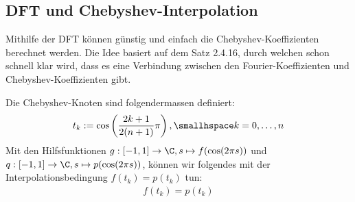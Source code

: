 \subsection{DFT und Chebyshev-Interpolation}
Mithilfe der DFT können günstig und einfach die Chebyshev-Koeffizienten berechnet werden.
Die Idee basiert auf dem Satz 2.4.16, durch welchen schon schnell klar wird, dass es eine Verbindung zwischen den Fourier-Koeffizienten und Chebyshev-Koeffizienten gibt.

Die Chebyshev-Knoten sind folgendermassen definiert:
\begin{align*}
    t_k := \cos\left( \frac{2k + 1}{2(n + 1)} \pi \right), \smallhspace k = 0, \ldots, n
\end{align*}
Mit den Hilfsfunktionen $g: [-1, 1] \rightarrow \C, s \mapsto f(\cos(2\pi s))$ und $q: [-1, 1] \rightarrow \C, s \mapsto p(\cos(2\pi s))$,
können wir folgendes mit der Interpolationsbedingung $f(t_k) = p(t_k)$ tun:
\begin{align*}
    f(t_k) = p(t_k)
\end{align*}

